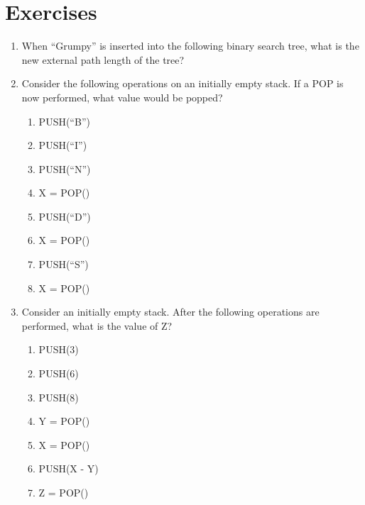 \documentclass{pset_template}
\begin{document}
\section{Exercises}
\begin{enumerate}
\item When ``Grumpy'' is inserted into the following binary search tree, what
is the new external path length of the tree?
\begin{center}
\end{center}

\item Consider the following operations on an initially empty stack.
If a POP is now performed, what value would be popped?
\begin{multicols}{4}
\begin{enumerate}
\item PUSH(``B'')
\item PUSH(``I'')
\item PUSH(``N'')
\item X = POP()
\item PUSH(``D'')
\item X = POP()
\item PUSH(``S'')
\item X = POP()
\end{enumerate}
\end{multicols}

\item Consider an initially empty stack.
After the following operations are performed, what is the value of Z?
\begin{multicols}{3}
\begin{enumerate}
\item PUSH(3)
\item PUSH(6)
\item PUSH(8)
\item Y = POP()
\item X = POP()
\item PUSH(X - Y)
\item Z = POP()
\end{enumerate}
\end{multicols}


\end{enumerate}
\end{document}

